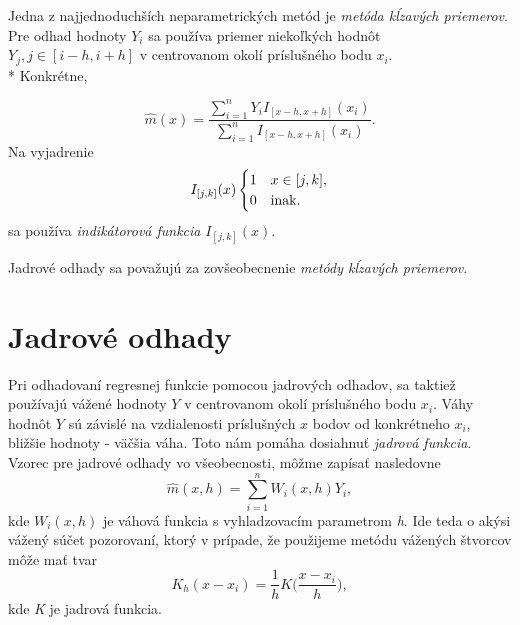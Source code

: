 Jedna z najjednoduchších neparametrických metód je \textit{ metóda kĺzavých priemerov}. Pre odhad hodnoty $Y_i$ sa používa priemer niekoľkých hodnôt $Y_j,  j\in [i-h,i+h]$ v centrovanom okolí príslušného bodu $x_i$. \\*
Konkrétne,
 
\begin{equation}\label{metodaVazenychPriemerov}
\hat{m}(x) = \dfrac{\sum\limits_{i=1}^{n}  Y_i I_{[x - h, x + h]}(x_i)}{\sum\limits_{i=1}^{n} I_{[x - h, x + h]}(x_i)}.
\end{equation}
Na vyjadrenie 
\begin{equation}\label{indikatorovaFunkcia}
I_{[j,k]}(x) \begin{cases}
1 & x \in [j,k], \\ 
0 & $inak.$
\end{cases}
\end{equation}
sa používa \textit{indikátorová funkcia} $I_{[j,k]}(x)$.

Jadrové odhady sa považujú za zovšeobecnenie \textit{metódy kĺzavých priemerov}.


\section{Jadrové odhady}\label{JadroveOdhady}

Pri odhadovaní regresnej funkcie pomocou jadrových odhadov, sa taktiež používajú vážené hodnoty $Y$ v centrovanom okolí príslušného bodu $x_i$. Váhy hodnôt $Y$ sú závislé na vzdialenosti príslušných $x$ bodov od konkrétneho $x_i$, bližšie hodnoty  -  väčšia váha. Toto nám pomáha dosiahnuť \textit{jadrová funkcia}. 
Vzorec pre jadrové odhady vo všeobecnosti, môžme zapísať nasledovne
\begin{equation}
\hat{m}(x,h) = \sum\limits_{i=1}^{n} W_i(x,h)Y_i,
\end{equation}
kde $ W_i(x,h)$ je váhová funkcia s vyhladzovacím parametrom \textit{h}. Ide teda o akýsi vážený súčet pozorovaní, ktorý v prípade, že použijeme metódu vážených štvorcov môže mať tvar
\begin{equation}\label{metodaVazStvorcov}
K_h(x - x_i) = \frac{1}{h}K\Big(\frac{x-x_i}{h}\Big),
\end{equation}
kde \textit{K} je jadrová funkcia.

